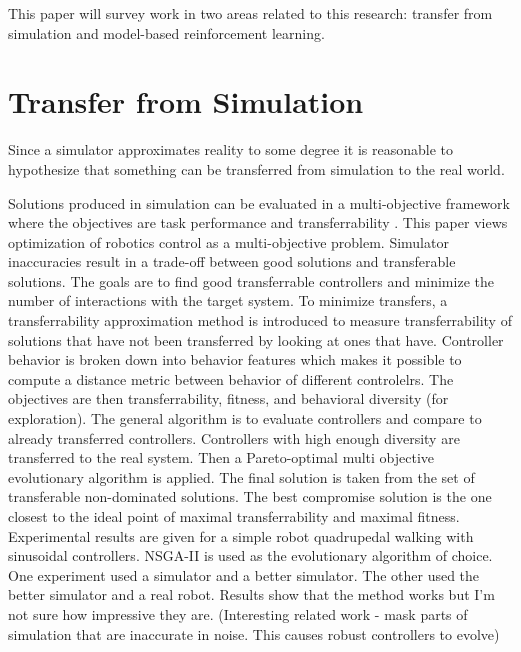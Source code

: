 \documentclass[12 pt]{article}
\begin{document}
This paper will survey work in two areas related to this research: transfer from simulation and model-based reinforcement learning.

\section{Transfer from Simulation}

Since a simulator approximates reality to some degree it is reasonable to hypothesize that something can be transferred from simulation to the real world.

Solutions produced in simulation can be evaluated in a multi-objective framework where the objectives are task performance and transferrability \cite{koos2010crossing}. 
This paper views optimization of robotics control as a multi-objective problem. Simulator inaccuracies result in a trade-off between good solutions and transferable solutions. The goals are to find good transferrable controllers and minimize the number of interactions with the target system. To minimize transfers, a transferrability approximation method is introduced to measure transferrability of solutions that have not been transferred by looking at ones that have. Controller behavior is broken down into behavior features which makes it possible to compute a distance metric between behavior of different controlelrs. The objectives are then transferrability, fitness, and behavioral diversity (for exploration). The general algorithm is to evaluate controllers and compare to already transferred controllers. Controllers with high enough diversity are transferred to the real system. Then a Pareto-optimal multi objective evolutionary algorithm is applied. The final solution is taken from the set of transferable non-dominated solutions. The best compromise solution is the one closest to the ideal point of maximal transferrability and maximal fitness. Experimental results are given for a simple robot quadrupedal walking with sinusoidal controllers. NSGA-II is used as the evolutionary algorithm of choice. One experiment used a simulator and a better simulator. The other used the better simulator and a real robot. Results show that the method works but I'm not sure how impressive they are. (Interesting related work - mask parts of simulation that are inaccurate in noise. This causes robust controllers to evolve)
\end{document}
